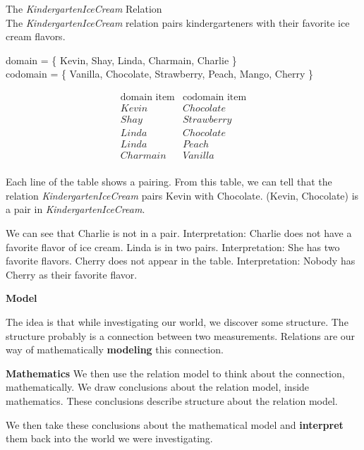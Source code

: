 \documentclass{ximera}
\begin{document}
\begin{example} The \textit{KindergartenIceCream} Relation\\
The \textit{KindergartenIceCream} relation pairs kindergarteners with their favorite ice cream flavors.

domain = \{ Kevin, Shay, Linda, Charmain, Charlie \}  \\
codomain = \{ Vanilla, Chocolate, Strawberry, Peach, Mango, Cherry \} 

\[
\begin{array}{l|l}
    \text{domain item}      & \text{codomain item}      \\ \hline
    Kevin   &  Chocolate \\
    Shay   & Strawberry \\
    Linda  &  Chocolate \\
    Linda  &  Peach \\
    Charmain &  Vanilla \\ 
\end{array}
\]


Each line of the table shows a pairing. From this table, we can tell that the relation \textit{KindergartenIceCream} pairs Kevin with Chocolate.  (Kevin, Chocolate) is a pair in \textit{KindergartenIceCream}.

We can see that Charlie is not in a pair.  Interpretation: Charlie does not have a favorite flavor of ice cream. Linda is in two pairs.  Interpretation: She has two favorite flavors.  Cherry does not appear in the table. Interpretation: Nobody has Cherry as their favorite flavor.

\end{example} 




\begin{idea} \textbf{\textcolor{red!80!black}{Model}} 


The idea is that while investigating our world, we discover some structure.  The structure probably is a connection between two measurements. Relations are our way of mathematically \textbf{\textcolor{red!80!black}{modeling}} this connection.

\begin{idea} \textbf{\textcolor{red!80!black}{Mathematics}} 
We then use the relation model to think about the connection, mathematically.  We draw conclusions about the relation model, inside mathematics. These conclusions describe structure about the relation model.
\end{idea}

We then take these conclusions about the mathematical model and \textbf{\textcolor{purple!85!blue}{interpret}} them back into the world we were investigating.

\end{idea}
\end{document}
